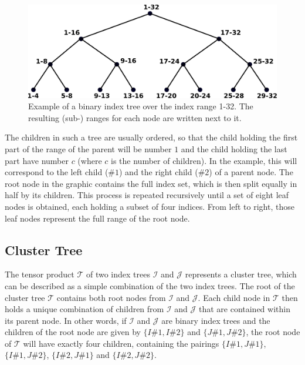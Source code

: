 \begin{figure}[h]
    \centering
    \includegraphics[width=0.7\linewidth]{chapters/4_hierarchical_matrices/figures/index_tree.pdf}
    \caption[Index Tree]{Example of a binary index tree over the index range 1-32. The resulting (sub-) ranges for each node are written next to it.}
    \label{fig:index_tree}
\end{figure}

The children in such a tree are usually ordered, so that the child holding the first part of the range of the parent will be number $1$ and the child holding the last part have number $c$ (where $c$ is the number of children). In the example, this will correspond to the left child ($\#1$) and the right child ($\#2$) of a parent node. The root node in the graphic contains the full index set, which is then split equally in half by its children. This process is repeated recursively until a set of eight leaf nodes is obtained, each holding a subset of four indices. From left to right, those leaf nodes represent the full range of the root node.



\subsection{Cluster Tree}
\label{sec:cluster_tree}

The tensor product $\mathcal{T}$ of two index trees $\mathcal{I}$ and $\mathcal{J}$ represents a cluster tree, which can be described as a simple combination of the two index trees. The root of the cluster tree $\mathcal{T}$ contains both root nodes from $\mathcal{I}$ and $\mathcal{J}$. Each child node in $\mathcal{T}$ then holds a unique combination of children from $\mathcal{I}$ and $\mathcal{J}$ that are contained within its parent node. In other words, if $\mathcal{I}$ and $\mathcal{J}$ are binary index trees and the children of the root node are given by $\{I\#1, I\#2\}$ and $\{J\#1, J\#2\}$, the root node of $\mathcal{T}$ will have exactly four children, containing the pairings $\{I\#1, J\#1\}$, $\{I\#1, J\#2\}$, $\{I\#2, J\#1\}$ and $\{I\#2, J\#2\}$.

